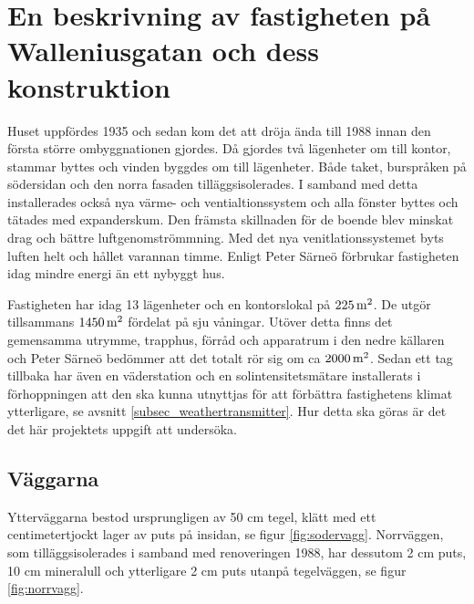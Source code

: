 \section{En beskrivning av fastigheten på Walleniusgatan och dess konstruktion}
\label{subsec:thehouse}




Huset uppfördes 1935\cite{ritningar_urspr} och sedan kom det att dröja ända till 1988 innan den första större ombyggnationen gjordes. Då gjordes två lägenheter om till kontor, stammar byttes och vinden byggdes om till lägenheter. Både taket, burspråken på södersidan och den norra fasaden tilläggsisolerades. I samband med detta installerades också nya värme- och ventialtionssystem och alla fönster byttes och tätades med expanderskum. Den främsta skillnaden för de boende blev minskat drag och bättre luftgenomströmmning.  Med det nya venitlationssystemet byts luften helt och hållet varannan timme. Enligt Peter Särneö\cite{petersarneo} förbrukar fastigheten idag mindre energi än ett nybyggt hus.

Fastigheten har idag 13 lägenheter och en kontorslokal på $\unit[225]{m^2}$. De utgör tillsammans $\unit[1450]{m^2}$ fördelat på sju våningar. Utöver detta finns det gemensamma utrymme, trapphus, förråd och apparatrum i den nedre källaren och Peter Särneö\cite{petersarneo} bedömmer att det totalt rör sig om ca $\unit[2000]{m^2}$. Sedan ett tag tillbaka har även en väderstation och en solintensitetsmätare installerats i förhoppningen att den ska kunna utnyttjas för att förbättra fastighetens klimat ytterligare, se avsnitt \ref{subsec_weathertransmitter}. Hur detta ska göras är det det här projektets uppgift att undersöka.


\subsection{Väggarna}

Ytterväggarna bestod ursprungligen av 50 cm tegel, klätt med ett centimetertjockt lager av puts på insidan, se figur \ref{fig:sodervagg}. Norrväggen, som tilläggsisolerades i samband med renoveringen 1988, har dessutom 2 cm puts, 10 cm mineralull och ytterligare 2 cm puts utanpå tegelväggen, se figur \ref{fig:norrvagg}.\cite{kandidatarbete2010}\cite{petersarneo}

